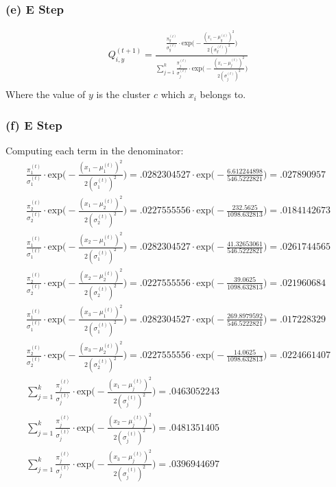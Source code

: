 \documentclass[11pt, oneside]{article}   	%
\begin{document}
\subsubsection{(e) E Step}
\begin{gather*}
Q_{i, y}^{(t + 1)} = \frac{\frac{\pi_{y}^{(t)}}{\sigma_{y}^{(t)}} \cdot \text{exp}\bigg(-\frac{(x_i - \mu_{y}^{(t)})^2}{2(\sigma_{y}^{(t)})^2}\bigg)}{\sum_{j = 1}^{k} \frac{\pi_{j}^{(t)}}{\sigma_{j}^{(t)}} \cdot \text{exp}\bigg(-\frac{(x_i - \mu_{j}^{(t)})^2}{2(\sigma_{j}^{(t)})^2}\bigg)}\\
\end{gather*}
Where the value of $y$ is the cluster $c$ which $x_i$ belongs to.
\subsubsection{(f) E Step}
Computing each term in the denominator:
\begin{gather*}
\frac{\pi_{1}^{(t)}}{\sigma_{1}^{(t)}} \cdot \text{exp}\bigg(-\frac{(x_1 - \mu_{1}^{(t)})^2}{2(\sigma_{1}^{(t)})^2}\bigg) = .0282304527 \cdot \text{exp}\bigg( -\frac{6.612244898}{546.5222821} \bigg) = .027890957\\
\frac{\pi_{2}^{(t)}}{\sigma_{2}^{(t)}} \cdot \text{exp}\bigg(-\frac{(x_1 - \mu_{2}^{(t)})^2}{2(\sigma_{2}^{(t)})^2}\bigg) = .0227555556 \cdot \text{exp}\bigg( -\frac{232.5625}{1098.632813} \bigg) = .0184142673\\
\frac{\pi_{1}^{(t)}}{\sigma_{1}^{(t)}} \cdot \text{exp}\bigg(-\frac{(x_2 - \mu_{1}^{(t)})^2}{2(\sigma_{1}^{(t)})^2}\bigg) = .0282304527 \cdot \text{exp}\bigg( -\frac{41.32653061}{546.5222821} \bigg) = .0261744565\\
\frac{\pi_{2}^{(t)}}{\sigma_{2}^{(t)}} \cdot \text{exp}\bigg(-\frac{(x_2 - \mu_{2}^{(t)})^2}{2(\sigma_{2}^{(t)})^2}\bigg) = .0227555556 \cdot \text{exp}\bigg( -\frac{39.0625}{1098.632813} \bigg) = .021960684\\
\frac{\pi_{1}^{(t)}}{\sigma_{1}^{(t)}} \cdot \text{exp}\bigg(-\frac{(x_3 - \mu_{1}^{(t)})^2}{2(\sigma_{1}^{(t)})^2}\bigg) = .0282304527 \cdot \text{exp}\bigg( -\frac{269.8979592}{546.5222821} \bigg) = .017228329\\
\frac{\pi_{2}^{(t)}}{\sigma_{2}^{(t)}} \cdot \text{exp}\bigg(-\frac{(x_3 - \mu_{2}^{(t)})^2}{2(\sigma_{2}^{(t)})^2}\bigg) = .0227555556 \cdot \text{exp}\bigg( -\frac{14.0625}{1098.632813} \bigg) = .0224661407\\
\sum_{j = 1}^{k} \frac{\pi_{j}^{(t)}}{\sigma_{j}^{(t)}} \cdot \text{exp}\bigg(-\frac{(x_1 - \mu_{j}^{(t)})^2}{2(\sigma_{j}^{(t)})^2}\bigg) = .0463052243\\
\sum_{j = 1}^{k} \frac{\pi_{j}^{(t)}}{\sigma_{j}^{(t)}} \cdot \text{exp}\bigg(-\frac{(x_2 - \mu_{j}^{(t)})^2}{2(\sigma_{j}^{(t)})^2}\bigg) = .0481351405\\
\sum_{j = 1}^{k} \frac{\pi_{j}^{(t)}}{\sigma_{j}^{(t)}} \cdot \text{exp}\bigg(-\frac{(x_3 - \mu_{j}^{(t)})^2}{2(\sigma_{j}^{(t)})^2}\bigg) = .0396944697\\
\end{gather*}
\end{document}
